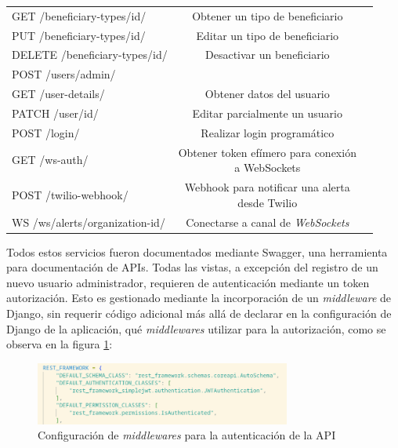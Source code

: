 \begin{table}[H]
\begin{tabular}{l c c}
		GET /beneficiary-types/{id}/ & Obtener un tipo de beneficiario \\
		PUT /beneficiary-types/{id}/ & Editar un tipo de beneficiario		\\
		DELETE /beneficiary-types/{id}/ & Desactivar un beneficiario \\
		\hline
		POST /users/admin/ & \makecell{Crear un usuario administrador}  \\			
		GET /user-details/ & Obtener datos del usuario \\
		PATCH /user/{id}/ & Editar parcialmente un usuario \\
		\hline
		POST /login/ & Realizar login programático \\	
		GET /ws-auth/ & \makecell{Obtener token efímero para  conexión \\ a WebSockets} \\
		POST /twilio-webhook/ & \makecell{Webhook para notificar una  alerta \\ desde Twilio} \\	
		WS /ws/alerts/organization-{id}/ & Conectarse a canal de \textit{WebSockets}	\\
		\bottomrule
		\hline
	\end{tabular}
	\label{tab:endpoints}
\end{table}

Todos estos servicios fueron documentados mediante Swagger, una herramienta para documentación de APIs\citep{DJANGO:6}. Todas las vistas, a excepción del registro de un nuevo usuario administrador, requieren de autenticación mediante un token autorización. Esto es gestionado mediante la incorporación de un \textit{middleware} de Django, sin requerir código adicional más allá de declarar en la configuración de Django de la aplicación, qué \textit{middlewares} utilizar para la autorización, como se observa en la figura \ref{backend:settings1}:

\begin{figure}[H]
	\centering
	\includegraphics[width=0.75\textwidth]{./Figures/backend-settings1.png}
	\caption{Configuración de \textit{middlewares} para la autenticación de la API}
	\label{backend:settings1}
\end{figure}

